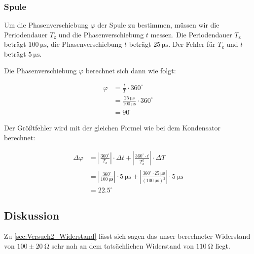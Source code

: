         \subsubsection{Spule}
        \label{sec:Versuch2_Spule}
            
            Um die Phasenverschiebung $\varphi$ der Spule zu bestimmen, müssen wir die Periodendauer $T_{\mathrm{z}}$ und die Phasenverschiebung $t$ messen.
            Die Periodendauer $T_{\mathrm{z}}$ beträgt $100\ \mathrm{\mu s}$, die Phasenverschiebung $t$ beträgt $25\ \mathrm{\mu s}$. Der Fehler für $T_{\mathrm{z}}$ und $t$ beträgt $5\ \mathrm{\mu s}$.

            Die Phasenverschiebung $\varphi$ berechnet sich dann wie folgt:

            \begin{equation}
                \begin{aligned}
                    \varphi &= \frac{t}{T} \cdot 360^{\circ}\\
                         &= \frac{25\ \mathrm{\mu s}}{100\ \mathrm{\mu s}} \cdot 360^{\circ}\\
                         &= 90^{\circ}
                \end{aligned}
                \label{eq:Versuch2_Spule_Phasenverschiebung}
            \end{equation}

            Der Größtfehler wird mit der gleichen Formel wie bei dem Kondensator berechnet:

            \begin{equation}
                \begin{aligned}
                    \Delta \varphi &= \left|\frac{360^{\circ}}{T_{\mathrm{z}}}\right| \cdot \Delta t + \left|\frac{360^{\circ} \cdot t}{T_{\mathrm{z}}^{2}}\right| \cdot \Delta T\\
                                   &= \left|\frac{360^{\circ}}{100\ \mathrm{\mu s}}\right| \cdot 5\ \mathrm{\mu s} + \left|\frac{360^{\circ} \cdot 25\ \mathrm{\mu s}}{(100\ \mathrm{\mu s})^{2}}\right| \cdot 5\ \mathrm{\mu s}\\
                                   &= 22.5^{\circ}
                \end{aligned}
                \label{eq:Versuch2_Spule_Phasenverschiebung_Fehler}
            \end{equation}

            \subsection{Diskussion}
                Zu \ref{sec:Versuch2_Widerstand} lässt sich sagen das unser berechneter Widerstand von $100 \pm 20\ \mathrm{\Omega}$ sehr nah an dem tatsächlichen Widerstand von $110\ \mathrm{\Omega}$ liegt.

